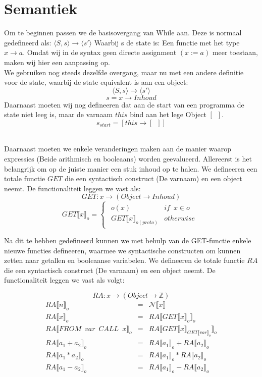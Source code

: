 \documentclass[12pt]{article}
\begin{document}
\section{Semantiek}
Om te beginnen passen we de basisovergang van While aan. Deze is normaal gedefineerd als:
$ \langle S,s \rangle \rightarrow \langle s\prime \rangle $
Waarbij s de state is: Een functie met het type
$ x \rightarrow a $.
Omdat wij in de syntax geen directe assignment $(x := a)$ meer toestaan, maken wij hier een aanpassing op.\\
We gebruiken nog steeds dezelfde overgang, maar nu met een andere definitie voor de state, waarbij de state equivalent is aan een object:
\[ \langle S,s \rangle \rightarrow \langle s\prime \rangle \]
\[ s = x \rightarrow Inhoud \]
Daarnaast moeten wij nog defineeren dat aan de start van een programma de state niet leeg is, maar de varnaam $ this $ bind aan het lege Object $ [\enspace] $.
\[ s_{start} = [this \rightarrow [\enspace]]\]
\\
\par
Daarnaast moeten we enkele veranderingen maken aan de manier waarop expressies (Beide arithmisch en booleaans) worden geevalueerd. Allereerst is het belangrijk om op de juiste manier een stuk inhoud op te halen. We defineeren een totale functie $ GET $ die een syntactisch construct (De varnaam) en een object neemt. De functionaliteit leggen we vast als:
\[ GET: x \rightarrow (Object \rightarrow Inhoud) \]
\[
GET\llbracket x \rrbracket_o =
\begin{cases}
\begin{matrix}
o(x) & if \enspace x \in o\\
GET\llbracket x \rrbracket_{o(proto)} & otherwise
\end{matrix}
\end{cases}
\]

Na dit te hebben gedefineerd kunnen we met behulp van de GET-functie enkele nieuwe functies defineeren, waarmee we syntactische constructen om kunnen zetten naar getallen en booleaanse variabelen. We defineeren de totale functie $ RA $ die een syntactisch construct (De varnaam) en een object neemt. De functionaliteit leggen we vast als volgt:

\[ RA: x \rightarrow (Object \rightarrow \mathds{Z} ) \]
\[
\begin{matrix}
RA\llbracket n \rrbracket_o & = & \mathcal{N}\llbracket x \rrbracket\\
RA\llbracket x \rrbracket_o & = & RA\llbracket GET\llbracket x \rrbracket_o \rrbracket_o\\
RA\llbracket FROM \enspace var \enspace CALL \enspace x \rrbracket_o & = & RA\llbracket GET\llbracket x \rrbracket_{GET\llbracket var \rrbracket_o} \rrbracket_o\\
RA\llbracket a_1 + a_2 \rrbracket_o & = & RA\llbracket a_1 \rrbracket_o + RA\llbracket a_2 \rrbracket_o\\
RA\llbracket a_1 * a_2 \rrbracket_o & = & RA\llbracket a_1 \rrbracket_o * RA\llbracket a_2 \rrbracket_o\\
RA\llbracket a_1 - a_2 \rrbracket_o & = & RA\llbracket a_1 \rrbracket_o - RA\llbracket a_2 \rrbracket_o\\
\end{matrix}
\]
\end{document}
